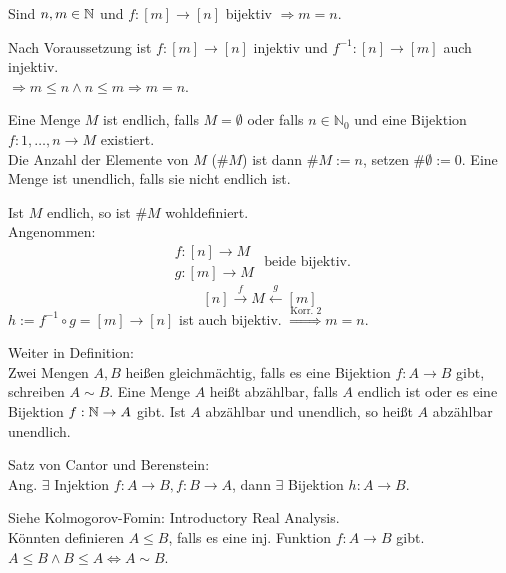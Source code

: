 \documentclass[../ana1.tex]{subfiles}
\begin{document}
\begin{kor}
	Sind \(n,m\in\mathbb{N} \) und \(f:[m]\rightarrow[n]\) bijektiv \(\Rightarrow m=n\).
\end{kor}
\begin{bew}
	Nach Voraussetzung ist \(f: [m]\rightarrow[n]\) injektiv und \(f^{-1}:[n]\rightarrow[m]\) auch injektiv.\\
	\(\Rightarrow m\leq n \wedge n \leq m \Rightarrow m = n\).
\end{bew}

\begin{defi}
	Eine Menge $M$ ist endlich, falls $M=\emptyset$ oder falls $n\in\mathbb{N}_0$ und eine Bijektion $f:{1,\ldots,n}\rightarrow M$ existiert.\\
	Die Anzahl der Elemente von $M$ ($\#M$) ist dann $\#M:=n$, setzen $\#\emptyset := 0$. Eine Menge ist unendlich, falls sie nicht endlich ist.
	
	\begin{bem}
		Ist \(M\) endlich, so ist \( \#M\) wohldefiniert. \\
		Angenommen:
		\[ \begin{array}{lr}
				f:[n]\rightarrow M \\
				g:[m]\rightarrow M
			\end{array}
			\text{ beide bijektiv.}\]
		\[ [n]\overset{f}{\longrightarrow} M \overset{g}{\longleftarrow} [m] \]
		\( h:= f^{-1}\circ g = [m]\rightarrow[n]\) ist auch bijektiv. \(\overset{\text{Korr. 2}}{\Rightarrow} m=n\).
	\end{bem}

	Weiter in Definition:\\
	Zwei Mengen \(A,B\) heißen gleichmächtig, falls es eine Bijektion \(f: A\rightarrow B\) gibt, schreiben \(A\sim B\). Eine Menge \(A\) heißt abzählbar, falls \(A\) endlich ist oder es eine Bijektion \(f: \mathbb{N}\rightarrow A\) gibt. Ist \(A\) abzählbar und unendlich, so heißt \(A\) abzählbar unendlich.
\end{defi}

\begin{bem}
	Satz von Cantor und Berenstein:\\
	Ang. \(\exists \) Injektion \(f:A\rightarrow B, f:B\rightarrow A\), dann \(\exists \) Bijektion \(h:A\rightarrow B\).
\end{bem}
\begin{bew}
	Siehe Kolmogorov-Fomin: Introductory Real Analysis.\\
	Könnten definieren \(A\leq B\), falls es eine inj. Funktion \(f: A\rightarrow B\) gibt.\\
	\(A\leq B \wedge B\leq A \Leftrightarrow A\sim B\).
\end{bew}
\end{document}
